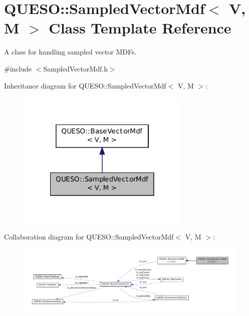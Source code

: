 \hypertarget{class_q_u_e_s_o_1_1_sampled_vector_mdf}{\section{Q\-U\-E\-S\-O\-:\-:Sampled\-Vector\-Mdf$<$ V, M $>$ Class Template Reference}
\label{class_q_u_e_s_o_1_1_sampled_vector_mdf}
}


A class for handling sampled vector M\-D\-Fs.  




{\ttfamily \#include $<$Sampled\-Vector\-Mdf.\-h$>$}



Inheritance diagram for Q\-U\-E\-S\-O\-:\-:Sampled\-Vector\-Mdf$<$ V, M $>$\-:
\nopagebreak
\begin{figure}[H]
\begin{center}
\leavevmode
\includegraphics[width=234pt]{class_q_u_e_s_o_1_1_sampled_vector_mdf__inherit__graph}
\end{center}
\end{figure}


Collaboration diagram for Q\-U\-E\-S\-O\-:\-:Sampled\-Vector\-Mdf$<$ V, M $>$\-:
\nopagebreak
\begin{figure}[H]
\begin{center}
\leavevmode
\includegraphics[width=350pt]{class_q_u_e_s_o_1_1_sampled_vector_mdf__coll__graph}
\end{center}
\end{figure}
